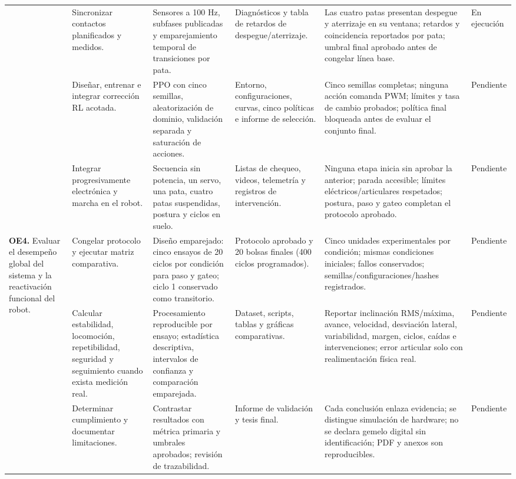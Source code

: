 \documentclass[10pt,letterpaper]{article}
\newcommand{\ejecucion}{\cellcolor{amarillo}En ejecución}
\newcommand{\pendiente}{\cellcolor{gris}Pendiente}
\begin{document}
\begin{landscape}
\begin{longtable}{p{3.6cm}p{3.7cm}p{4.2cm}p{3.6cm}p{5.0cm}p{1.6cm}}
& Sincronizar contactos planificados y medidos. & Sensores a 100 Hz, subfases publicadas y emparejamiento temporal de transiciones por pata. & Diagnósticos y tabla de retardos de despegue/aterrizaje. & Las cuatro patas presentan despegue y aterrizaje en su ventana; retardos y coincidencia reportados por pata; umbral final aprobado antes de congelar línea base. & \ejecucion\\
& Diseñar, entrenar e integrar corrección RL acotada. & PPO con cinco semillas, aleatorización de dominio, validación separada y saturación de acciones. & Entorno, configuraciones, curvas, cinco políticas e informe de selección. & Cinco semillas completas; ninguna acción comanda PWM; límites y tasa de cambio probados; política final bloqueada antes de evaluar el conjunto final. & \pendiente\\
& Integrar progresivamente electrónica y marcha en el robot. & Secuencia sin potencia, un servo, una pata, cuatro patas suspendidas, postura y ciclos en suelo. & Listas de chequeo, videos, telemetría y registros de intervención. & Ninguna etapa inicia sin aprobar la anterior; parada accesible; límites eléctricos/articulares respetados; postura, paso y gateo completan el protocolo aprobado. & \pendiente\\[2pt]
\hline
\multirow{3}{3.6cm}{\textbf{OE4.} Evaluar el desempeño global del sistema y la reactivación funcional del robot.}
& Congelar protocolo y ejecutar matriz comparativa. & Diseño emparejado: cinco ensayos de 20 ciclos por condición para paso y gateo; ciclo 1 conservado como transitorio. & Protocolo aprobado y 20 bolsas finales (400 ciclos programados). & Cinco unidades experimentales por condición; mismas condiciones iniciales; fallos conservados; semillas/configuraciones/hashes registrados. & \pendiente\\
& Calcular estabilidad, locomoción, repetibilidad, seguridad y seguimiento cuando exista medición real. & Procesamiento reproducible por ensayo; estadística descriptiva, intervalos de confianza y comparación emparejada. & Dataset, scripts, tablas y gráficas comparativas. & Reportar inclinación RMS/máxima, avance, velocidad, desviación lateral, variabilidad, margen, ciclos, caídas e intervenciones; error articular solo con realimentación física real. & \pendiente\\
& Determinar cumplimiento y documentar limitaciones. & Contrastar resultados con métrica primaria y umbrales aprobados; revisión de trazabilidad. & Informe de validación y tesis final. & Cada conclusión enlaza evidencia; se distingue simulación de hardware; no se declara gemelo digital sin identificación; PDF y anexos son reproducibles. & \pendiente\\
\end{longtable}
\end{landscape}
\end{document}
